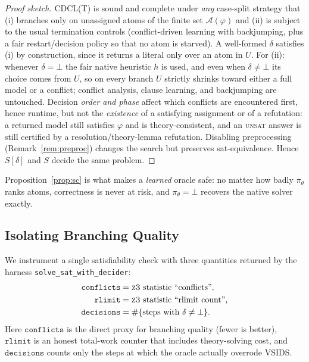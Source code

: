 \documentclass[letterpaper]{article} %
\theoremstyle{definition}
\theoremstyle{plain}
\theoremstyle{remark}
\newcommand{\solver}{\textsc{z3}}
\newcommand{\Atoms}{\mathcal{A}}
\newcommand{\Undec}{U}
\newcommand{\defer}{\bot}
\newcommand{\policy}{\pi_\theta}
\newcommand{\confl}{\texttt{conflicts}}
\newcommand{\rlimit}{\texttt{rlimit}}
\begin{document}
\begin{proof}[Proof sketch]
\textsc{CDCL(T)} is sound and complete under \emph{any} case-split strategy
that (i) branches only on unassigned atoms of the finite set
$\Atoms(\varphi)$ and (ii) is subject to the usual termination controls
(conflict-driven learning with backjumping, plus a fair restart/decision
policy so that no atom is starved). A well-formed $\delta$ satisfies (i) by
construction, since it returns a literal only over an atom in $\Undec$. For
(ii): whenever $\delta=\defer$ the fair native heuristic $h$ is used, and
even when $\delta\neq\defer$ its choice comes from $\Undec$, so on every
branch $\Undec$ strictly shrinks toward either a full model or a conflict;
conflict analysis, clause learning, and backjumping are untouched. Decision
\emph{order and phase} affect which conflicts are encountered first, hence
runtime, but not the \emph{existence} of a satisfying assignment or of a
refutation: a returned model still satisfies $\varphi$ and is
theory-consistent, and an \textsc{unsat} answer is still certified by a
resolution/theory-lemma refutation. Disabling preprocessing
(Remark~\ref{rem:preproc}) changes the search but preserves
sat-equivalence. Hence $S[\delta]$ and $S$ decide the same problem.
\end{proof}

Proposition~\ref{prop:sc} is what makes a \emph{learned} oracle safe: no
matter how badly $\policy$ ranks atoms, correctness is never at risk, and
$\policy=\defer$ recovers the native solver exactly.

\subsection{Isolating Branching Quality}
\label{sec:isolation}

We instrument a single satisfiability check with three quantities returned by
the harness \texttt{solve\_sat\_with\_decider}:
\begin{align*}
\confl &= \text{\solver{} statistic ``conflicts''},\\
\rlimit &= \text{\solver{} statistic ``rlimit count''},\\
\texttt{decisions} &= \#\{\text{steps with } \delta\neq\defer\}.
\end{align*}
Here $\confl$ is the direct proxy for branching quality (fewer is better),
$\rlimit$ is an honest total-work counter that includes theory-solving cost,
and $\texttt{decisions}$ counts only the steps at which the oracle actually
overrode VSIDS.
\end{document}
